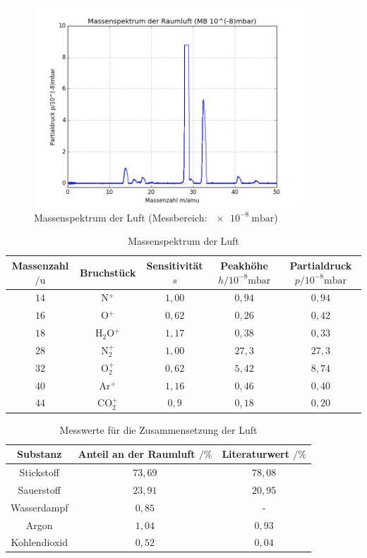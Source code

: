\begin{figure}[tb]
	\centering\includegraphics[width=0.9\textwidth]{fig/a4_2.png}
	\caption{Massenspektrum der Luft (Messbereich: $\SI{e-8}{\milli\bar}$)}
	\label{fig:v42}
\end{figure}

\begin{table}[tb]
 \centering
 \caption{Massenspektrum der Luft}
 \label{tab:41}
 \hskip-1.0cm
 \begin{tabular}{ccccc} \toprule
   Massenzahl $/\si{\amu}$ & Bruchstück & Sensitivität $s$ & Peakhöhe $h/10^{-8}\si{\milli \bar}$ & Partialdruck $p/10^{-8}\si{\milli \bar}$ \\ \midrule
   $14$ & N$^{+}$ & $1,00$ & $0,94$ & $0,94$\\
   $16$ & O$^{+}$ & $0,62$ & $0,26$ & $0,42$ \\
   $18$ & H$_{2}$O$^{+}$ & $1,17$ & $0,38$ & $0,33$ \\
   $28$ & N$_{2}^{+}$ & $1,00$ & $27,3$ & $27,3$ \\
   $32$ & O$_{2}^{+}$ & $0,62$ & $5,42$ & $8,74$ \\
   $40$ & Ar$^{+}$ & $1,16$ & $0,46$ & $0,40$ \\
   $44$ & CO$_{2}^{+}$ & $0,9$ & $0,18$ & $0,20$ \\ \bottomrule
 \end{tabular}
\end{table}

\begin{table}[tb]
 \centering
 \caption{Messwerte für die Zusammensetzung der Luft}
 \label{tab:42}
 \begin{tabular}{ccc} \toprule
   Substanz & Anteil an der Raumluft $/\%$ & Literaturwert \cite{lubw} $/\%$ \\ \midrule
   Stickstoff & $73,69$ & $78,08$ \\
   Sauerstoff & $23,91$ & $20,95$ \\
   Wasserdampf & $0,85$ & - \\
   Argon & $1,04$ & $0,93$ \\
   Kohlendioxid & $0,52$ & $0,04$ \\ \bottomrule
 \end{tabular}

\end{table}


